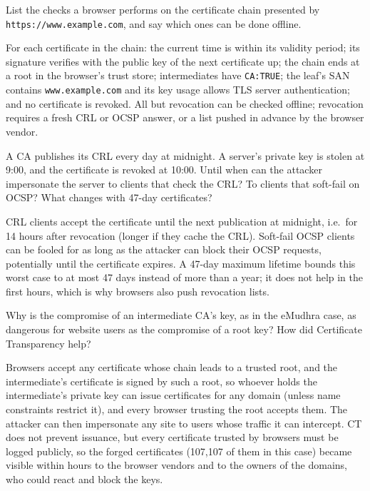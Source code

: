 \begin{exercise}
List the checks a browser performs on the certificate chain presented by \texttt{https://www.example.com}, and say which ones can be done offline.
\end{exercise}
\begin{solution}
For each certificate in the chain: the current time is within its validity period; its signature verifies with the public key of the next certificate up; the chain ends at a root in the browser's trust store; intermediates have \texttt{CA:TRUE}; the leaf's SAN contains \texttt{www.example.com} and its key usage allows TLS server authentication; and no certificate is revoked. All but revocation can be checked offline; revocation requires a fresh CRL or OCSP answer, or a list pushed in advance by the browser vendor.
\end{solution}

\begin{exercise}
A CA publishes its CRL every day at midnight. A server's private key is stolen at 9:00, and the certificate is revoked at 10:00. Until when can the attacker impersonate the server to clients that check the CRL? To clients that soft-fail on OCSP? What changes with 47-day certificates?
\end{exercise}
\begin{solution}
CRL clients accept the certificate until the next publication at midnight, i.e.\ for 14 hours after revocation (longer if they cache the CRL). Soft-fail OCSP clients can be fooled for as long as the attacker can block their OCSP requests, potentially until the certificate expires. A 47-day maximum lifetime bounds this worst case to at most 47 days instead of more than a year; it does not help in the first hours, which is why browsers also push revocation lists.
\end{solution}

\begin{exercise}
Why is the compromise of an intermediate CA's key, as in the eMudhra case, as dangerous for website users as the compromise of a root key? How did Certificate Transparency help?
\end{exercise}
\begin{solution}
Browsers accept any certificate whose chain leads to a trusted root, and the intermediate's certificate is signed by such a root, so whoever holds the intermediate's private key can issue certificates for any domain (unless name constraints restrict it), and every browser trusting the root accepts them. The attacker can then impersonate any site to users whose traffic it can intercept. CT does not prevent issuance, but every certificate trusted by browsers must be logged publicly, so the forged certificates (107{,}107 of them in this case) became visible within hours to the browser vendors and to the owners of the domains, who could react and block the keys.
\end{solution}

